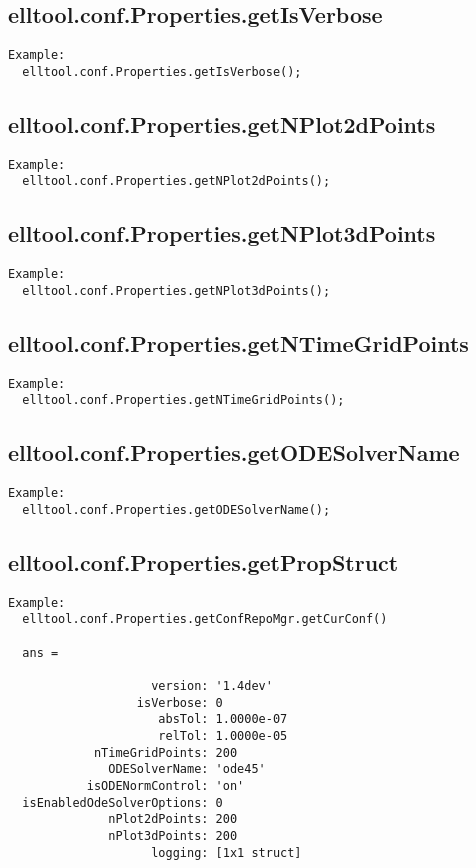 \subsection{\texorpdfstring{elltool.conf.Properties.getIsVerbose}{getIsVerbose}}\label{method:elltool.conf.Properties.getIsVerbose}
\begin{verbatim}
Example:
  elltool.conf.Properties.getIsVerbose();
\end{verbatim}
\subsection{\texorpdfstring{elltool.conf.Properties.getNPlot2dPoints}{getNPlot2dPoints}}\label{method:elltool.conf.Properties.getNPlot2dPoints}
\begin{verbatim}
Example:
  elltool.conf.Properties.getNPlot2dPoints();
\end{verbatim}
\subsection{\texorpdfstring{elltool.conf.Properties.getNPlot3dPoints}{getNPlot3dPoints}}\label{method:elltool.conf.Properties.getNPlot3dPoints}
\begin{verbatim}
Example:
  elltool.conf.Properties.getNPlot3dPoints();
\end{verbatim}
\subsection{\texorpdfstring{elltool.conf.Properties.getNTimeGridPoints}{getNTimeGridPoints}}\label{method:elltool.conf.Properties.getNTimeGridPoints}
\begin{verbatim}
Example:
  elltool.conf.Properties.getNTimeGridPoints();
\end{verbatim}
\subsection{\texorpdfstring{elltool.conf.Properties.getODESolverName}{getODESolverName}}\label{method:elltool.conf.Properties.getODESolverName}
\begin{verbatim}
Example:
  elltool.conf.Properties.getODESolverName();
\end{verbatim}
\subsection{\texorpdfstring{elltool.conf.Properties.getPropStruct}{getPropStruct}}\label{method:elltool.conf.Properties.getPropStruct}
\begin{verbatim}
Example:
  elltool.conf.Properties.getConfRepoMgr.getCurConf()

  ans =

                    version: '1.4dev'
                  isVerbose: 0
                     absTol: 1.0000e-07
                     relTol: 1.0000e-05
            nTimeGridPoints: 200
              ODESolverName: 'ode45'
           isODENormControl: 'on'
  isEnabledOdeSolverOptions: 0
              nPlot2dPoints: 200
              nPlot3dPoints: 200
                    logging: [1x1 struct]
\end{verbatim}
